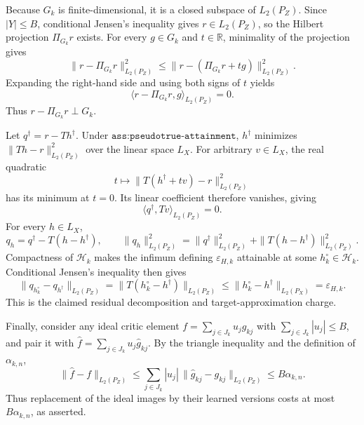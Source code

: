 Because \(G_k\) is finite-dimensional, it is a closed subspace of \(L_2(P_Z)\). Since \(|Y|\le B\), conditional Jensen's inequality gives \(r\in L_2(P_Z)\), so the Hilbert projection \(\Pi_{G_k}r\) exists. For every \(g\in G_k\) and \(t\in\mathbb R\), minimality of the projection gives
\[
 \|r-\Pi_{G_k}r\|_{L_2(P_Z)}^2
 \le \|r-(\Pi_{G_k}r+t g)\|_{L_2(P_Z)}^2.
\]
Expanding the right-hand side and using both signs of \(t\) yields
\[
 \langle r-\Pi_{G_k}r,g\rangle_{L_2(P_Z)}=0.
\]
Thus \(r-\Pi_{G_k}r\perp G_k\).

Let \(q^\dagger=r-Th^\dagger\). Under \(\texttt{ass:pseudotrue-attainment}\), \(h^\dagger\) minimizes \(\|Th-r\|_{L_2(P_Z)}^2\) over the linear space \(L_X\). For arbitrary \(v\in L_X\), the real quadratic
\[
 t\longmapsto \|T(h^\dagger+t v)-r\|_{L_2(P_Z)}^2
\]
has its minimum at \(t=0\). Its linear coefficient therefore vanishes, giving
\[
 \langle q^\dagger,Tv\rangle_{L_2(P_Z)}=0.
\]
For every \(h\in L_X\),
\[
 q_h=q^\dagger-T(h-h^\dagger),
 \qquad
 \|q_h\|_{L_2(P_Z)}^2
 =\|q^\dagger\|_{L_2(P_Z)}^2
  +\|T(h-h^\dagger)\|_{L_2(P_Z)}^2.
\]
Compactness of \(\mathcal H_k\) makes the infimum defining \(\varepsilon_{H,k}\) attainable at some \(h_k^\circ\in\mathcal H_k\). Conditional Jensen's inequality then gives
\[
 \|q_{h_k^\circ}-q_{h^\dagger}\|_{L_2(P_Z)}
 =\|T(h_k^\circ-h^\dagger)\|_{L_2(P_Z)}
 \le\|h_k^\circ-h^\dagger\|_{L_2(P_X)}
 =\varepsilon_{H,k}.
\]
This is the claimed residual decomposition and target-approximation charge.

Finally, consider any ideal critic element \(f=\sum_{j\in J_k}u_jg_{kj}\) with \(\sum_{j\in J_k}|u_j|\le B\), and pair it with \(\widehat f=\sum_{j\in J_k}u_j\widehat g_{kj}\). By the triangle inequality and the definition of \(\alpha_{k,n}\),
\[
 \|\widehat f-f\|_{L_2(P_Z)}
 \le\sum_{j\in J_k}|u_j|\,\|\widehat g_{kj}-g_{kj}\|_{L_2(P_Z)}
 \le B\alpha_{k,n}.
\]
Thus replacement of the ideal images by their learned versions costs at most \(B\alpha_{k,n}\), as asserted.